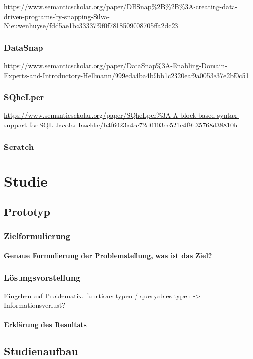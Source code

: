 \documentclass[a4paper, 12pt, oneside, BCOR=1cm,toc=chapterentrywithdots]{scrbook}
\begin{document}
\url{https://www.semanticscholar.org/paper/DBSnap\%2B\%2B\%3A-creating-data-driven-programs-by-snapping-Silva-Nieuwenhuyse/fdd5ae1bc33337f9f0f7818509008705ffa2dc23}

\subsection{DataSnap}
\parencite{hellmannDataSnapEnabling2015}
\url{https://www.semanticscholar.org/paper/DataSnap\%3A-Enabling-Domain-Experts-and-Introductory-Hellmann/999eda4ba4b9bb1c2320eaf9a0053e37e2bf0c51}

\subsection{SQheLper}
\parencite{jacobsSQheLperBlockbased2021}
\url{https://www.semanticscholar.org/paper/SQheLper\%3A-A-block-based-syntax-support-for-SQL-Jacobs-Jaschke/b4f6023a4ee72d0103ee521c4f9b35768d38810b}
\subsection{Scratch}


\chapter{Studie}
\section{Prototyp}
\subsection{Zielformulierung}
\subsubsection{Genaue Formulierung der Problemstellung, was ist das Ziel?}
\subsection{Lösungsvorstellung}
Eingehen auf Problematik: functions typen / queryables typen -> Informationsverlust?
\subsubsection{Erklärung des Resultats}
\section{Studienaufbau}
\end{document}

